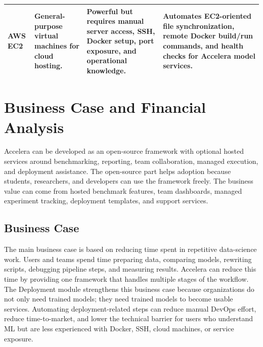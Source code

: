 \documentclass[12pt,a4paper]{report}
\begin{document}
\begin{table}[!htbp]
\begin{tabular}{p{}p{}p{}p{}}
AWS EC2 &
General-purpose virtual machines for cloud hosting. &
Powerful but requires manual server access, SSH, Docker setup, port exposure,
and operational knowledge. &
Automates EC2-oriented file synchronization, remote Docker build/run commands,
and health checks for Accelera model services. \\

\bottomrule
\end{tabular}
\end{table}

\newpage
\section{Business Case and Financial Analysis}

Accelera can be developed as an open-source framework with optional hosted
services around benchmarking, reporting, team collaboration, managed execution,
and deployment assistance. The open-source part helps adoption because students,
researchers, and developers can use the framework freely. The business value
can come from hosted benchmark features, team dashboards, managed experiment
tracking, deployment templates, and support services.

\subsection{Business Case}

The main business case is based on reducing time spent in repetitive
data-science work. Users and teams spend time preparing data, comparing models,
rewriting scripts, debugging pipeline steps, and measuring results. Accelera can
reduce this time by providing one framework that handles multiple stages of the
workflow. The Deployment module strengthens this business case because
organizations do not only need trained models; they need trained models to
become usable services. Automating deployment-related steps can reduce manual
DevOps effort, reduce time-to-market, and lower the technical barrier for users
who understand ML but are less experienced with Docker, SSH, cloud machines, or
service exposure.
\end{document}
